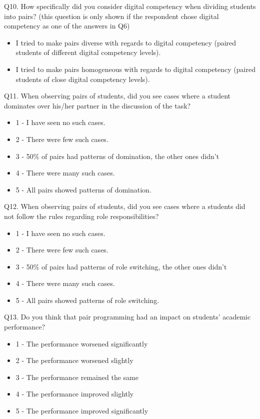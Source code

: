 \documentclass[conference]{IEEEtran}
\begin{document}
Q10. How specifically did you consider digital competency when dividing students into pairs? (this question is only shown if the respondent chose digital competency as one of the answers in Q6)
    \begin{itemize}
        \item I tried to make pairs diverse with regards to digital competency (paired students of different digital competency levels).
        \item I tried to make pairs homogeneous with regards to digital competency (paired students of close digital competency levels).
    \end{itemize}
    
Q11. When observing pairs of students, did you see cases where a student dominates over his/her partner in the discussion of the task?
    \begin{itemize}
        \item 1 - I have seen no such cases.
        \item 2 - There were few such cases.
        \item 3 - 50\% of pairs had patterns of domination, the other ones didn't
        \item 4 - There were many such cases.
        \item 5 - All pairs showed patterns of domination.
    \end{itemize}

Q12. When observing pairs of students, did you see cases where a students did not follow the rules regarding role responsibilities?
    \begin{itemize}
        \item 1 - I have seen no such cases.
        \item 2 - There were few such cases.
        \item 3 - 50\% of pairs had patterns of role switching, the other ones didn't
        \item 4 - There were many such cases.
        \item 5 - All pairs showed patterns of role switching.
    \end{itemize}
    
Q13. Do you think that pair programming had an impact on students' academic performance?
    \begin{itemize}
        \item 1 - The performance worsened significantly
        \item 2 - The performance worsened slightly
        \item 3 - The performance remained the same
        \item 4 - The performance improved slightly
        \item 5 - The performance improved significantly
    \end{itemize}
    
\end{document}
